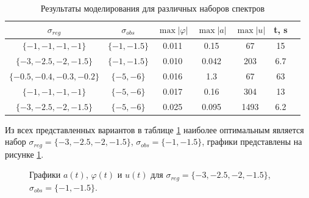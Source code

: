 \begin{table}[h]
\centering
\caption{Результаты моделирования для различных наборов спектров}
\label{3_tab_2}
\begin{tabular}{ccccccc}
\toprule
$\sigma_{reg}$  & $\sigma_{obs}$  & $\max |\varphi|$ & $\max |a|$ & $\max |u|$& t, s \\
\midrule
$\{ -1, -1, -1, -1\}$  & $\{-1, -1.5 \}$  & 0.011  &  0.15  &  67 & 15  \\
$\{ -3, -2.5, -2, -1.5\}$  & $\{-1, -1.5 \}$  & 0.010  &  0.042  &  203 & 6.7  \\
$\{ -0.5, -0.4, -0.3, -0.2\}$  & $\{-5, -6 \}$  & 0.016  &  1.3  &  67 & 63  \\
$\{ -1, -1, -1, -1\}$  & $\{-5, -6 \}$  & 0.017  &  0.16  &  304 & 13  \\
$\{ -3, -2.5, -2, -1.5\}$  & $\{-5, -6 \}$  & 0.025  &  0.095  &  1493 & 6.2  \\
\bottomrule
\end{tabular}
\end{table}

Из всех представленных вариантов в таблице \ref{3_tab_2} наиболее оптимальным является набор $\sigma_{reg} = \{ -3, -2.5, -2, -1.5\}$, $\sigma_{obs}= \{-1, -1.5 \}$, графики представлены на рисунке \ref{3_xu_k1l1}.

\begin{figure}[!h]
\caption{Графики $a(t)$, $\varphi(t)$ и $u(t)$ для $\sigma_{reg} = \{ -3, -2.5, -2, -1.5\}$, $\sigma_{obs}= \{-1, -1.5 \}$.}
\label{3_xu_k1l1}
\end{figure}

\endinput
